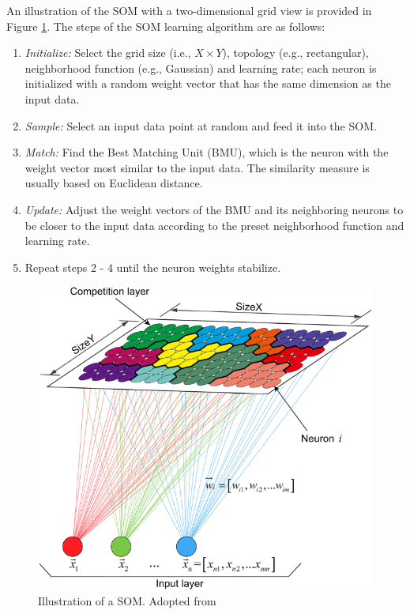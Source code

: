 An illustration of the SOM with a two-dimensional grid view is provided in Figure \ref{fig:SOM}. The steps of the SOM learning algorithm are as follows:

\begin{enumerate}
  	\item \emph{Initialize:} Select the grid size (i.e., $X \times Y$), topology (e.g., rectangular), neighborhood function (e.g., Gaussian) and learning rate; each neuron is initialized with a random weight vector that has the same dimension as the input data. 
	\item \emph{Sample:} Select an input data point at random and feed it into the SOM.
	\item \emph{Match:} Find the Best Matching Unit (BMU), which is the neuron with the weight vector most similar to the input data. The similarity measure is usually based on Euclidean distance. 
	\item \emph{Update:} Adjust the weight vectors of the BMU and its neighboring neurons to be closer to the input data according to the preset neighborhood function and learning rate.
	\item Repeat steps 2 - 4 until the neuron weights stabilize.
\end{enumerate}


\begin{figure}[h!]
\centering
  \includegraphics[scale=0.4]{figures/SOM_1.png}
  \caption{Illustration of a SOM. Adopted from \cite{Han2019}}
  \label{fig:SOM}
\end{figure}


